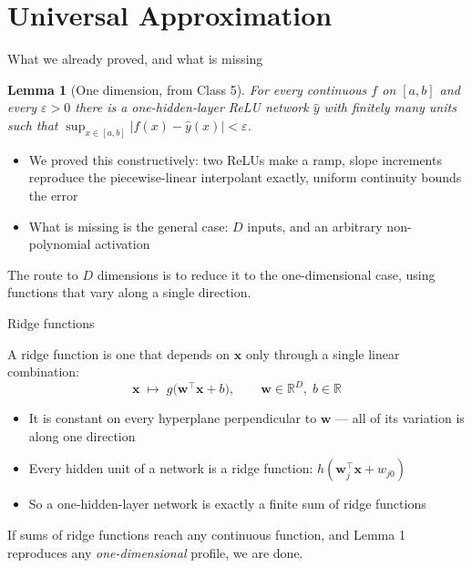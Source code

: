\documentclass[aspectratio=169, 11pt]{beamer}
\newtheorem{lemmax}[theorem]{Lemma}
\newcommand{\nosrc}{}       %
\begin{document}
\section{Universal Approximation}

\begin{frame}{What we already proved, and what is missing}
  \nosrc
  \begin{lemmax}[One dimension, from Class 5]
    {\small For every continuous $f$ on $[a,b]$ and every
    $\varepsilon>0$ there is a \alert{one-hidden-layer} ReLU network
    $\hat y$ with finitely many units such that
    $\sup_{x\in[a,b]}|f(x)-\hat y(x)|<\varepsilon$.}
  \end{lemmax}
  \vspace{0.2em}
  {\small
  \begin{itemize}\setlength{\itemsep}{3pt}
    \item We proved this \alert{constructively}: two ReLUs make a
          ramp, slope increments reproduce the piecewise-linear
          interpolant exactly, uniform continuity bounds the error
    \item What is missing is the general case: $D$ inputs, and an
          arbitrary non-polynomial activation
  \end{itemize}}
  \vspace{0.3em}
  \begin{redhighlight}
    {\small The route to $D$ dimensions is to reduce it to the
    one-dimensional case, using functions that vary along a
    \alert{single direction}.}
  \end{redhighlight}
\end{frame}

\begin{frame}{Ridge functions}
  \nosrc
  \vspace{0.2em}
  A \alert{ridge function} is one that depends on $\mathbf{x}$ only
  through a single linear combination:
  \[
    \mathbf{x} \;\longmapsto\; g\big(\mathbf{w}^{\!\top}\mathbf{x}+b\big),
    \qquad \mathbf{w}\in\mathbb{R}^{D},\; b\in\mathbb{R}
  \]
  \vfill
  {\small
  \begin{itemize}\setlength{\itemsep}{4pt}
    \item It is \alert{constant} on every hyperplane perpendicular to
          $\mathbf{w}$ --- all of its variation is along one
          direction
    \item \alert{Every hidden unit of a network is a ridge
          function}: $h(\mathbf{w}_j^{\!\top}\mathbf{x}+w_{j0})$
    \item So a one-hidden-layer network is exactly a \alert{finite
          sum of ridge functions}
  \end{itemize}}
  \vspace{0.1em}
  \begin{redhighlight}
    {\footnotesize If sums of ridge functions reach any continuous
    function, and Lemma 1 reproduces any \emph{one-dimensional}
    profile, we are done.}
  \end{redhighlight}
\end{frame}
\end{document}
